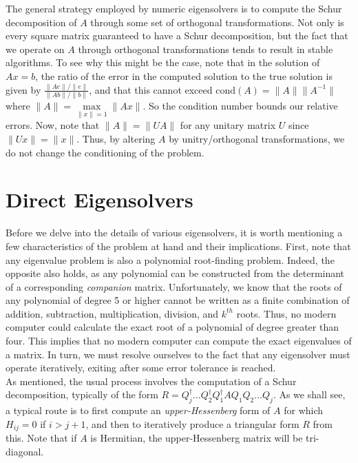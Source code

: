 \documentclass[11pt]{article}
\begin{document}
The general strategy employed by numeric eigensolvers is to compute the Schur decomposition of $A$ through some set of orthogonal transformations. Not only is every square matrix guaranteed to have a Schur decomposition, but the fact that we operate on $A$ through orthogonal transformations tends to result in stable algorithms. To see why this might be the case, note that in the solution of $Ax=b$, the ratio of the error in the computed solution to the true solution is given by $\frac{\| A e \| / \| e \|}{\| A b \| / \| b \|}$, and that this cannot exceed $\textrm{cond}(A) = \|A\| \|A^{-1}\|$ where $\|A\| = \max \limits_{\| x \| = 1} \| Ax \|$. So the condition number bounds our relative errors. Now, note that $\|A\| = \| U A \|$ for any unitary matrix $U$ since $\|Ux\| = \| x \|$. Thus, by altering $A$ by unitry/orthogonal transformations, we do not change the conditioning of the problem.

\section{Direct Eigensolvers}

Before we delve into the details of various eigensolvers, it is worth mentioning a few characteristics of the problem at hand and their implications. First, note that any eigenvalue problem is also a polynomial root-finding problem. Indeed, the opposite also holds, as any polynomial can be constructed from the determinant of a corresponding \textit{companion} matrix. Unfortunately, we know that the roots of any polynomial of degree 5 or higher cannot be written as a finite combination of addition, subtraction, multiplication, division, and $k^{th}$ roots. Thus, no modern computer could calculate the exact root of a polynomial of degree greater than four. This implies that no modern computer can compute the exact eigenvalues of a matrix. In turn, we must resolve ourselves to the fact that any eigensolver must operate iteratively, exiting after some error tolerance is reached. \\

As mentioned, the usual process involves the computation of a Schur decomposition, typically of the form $R = Q^\dagger_j ... Q^\dagger_2 Q^\dagger_1 A Q_1 Q_2 ... Q_j$. As we shall see, a typical route is to first compute an \textit{upper-Hessenberg} form of $A$ for which $H_{ij} = 0$ if $i > j + 1$, and then to iteratively produce a triangular form $R$ from this. Note that if $A$ is Hermitian, the upper-Hessenberg matrix will be tri-diagonal. \\
\end{document}
